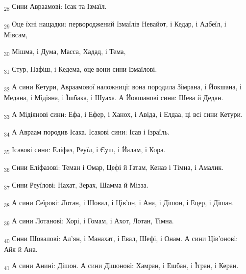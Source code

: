 \begin{tcolorbox}
\textsubscript{28} Сини Авраамові: Ісак та Ізмаїл.
\end{tcolorbox}
\begin{tcolorbox}
\textsubscript{29} Оце їхні нащадки: первороджений Ізмаїлів Невайот, і Кедар, і Адбеїл, і Мівсам,
\end{tcolorbox}
\begin{tcolorbox}
\textsubscript{30} Мішма, і Дума, Масса, Хадад, і Тема,
\end{tcolorbox}
\begin{tcolorbox}
\textsubscript{31} Єтур, Нафіш, і Кедема, оце вони сини Ізмаїлові.
\end{tcolorbox}
\begin{tcolorbox}
\textsubscript{32} А сини Кетури, Авраамової наложниці: вона породила Зімрана, і Йокшана, і Медана, і Мідіяна, і Їшбака, і Шуаха. А Йокшанові сини: Шева й Дедан.
\end{tcolorbox}
\begin{tcolorbox}
\textsubscript{33} А Мідіянові сини: Ефа, і Ефер, і Ханох, і Авіда, і Елдаа, ці всі сини Кетури.
\end{tcolorbox}
\begin{tcolorbox}
\textsubscript{34} А Авраам породив Ісака. Ісакові сини: Ісав і Ізраїль.
\end{tcolorbox}
\begin{tcolorbox}
\textsubscript{35} Ісавові сини: Еліфаз, Реуїл, і Єуш, і Йалам, і Кора.
\end{tcolorbox}
\begin{tcolorbox}
\textsubscript{36} Сини Еліфазові: Теман і Омар, Цефі й Ґатам, Кеназ і Тімна, і Амалик.
\end{tcolorbox}
\begin{tcolorbox}
\textsubscript{37} Сини Реуїлові: Нахат, Зерах, Шамма й Мізза.
\end{tcolorbox}
\begin{tcolorbox}
\textsubscript{38} А сини Сеїрові: Лотан, і Шовал, і Ців'он, і Ана, і Дішон, і Ецер, і Дішан.
\end{tcolorbox}
\begin{tcolorbox}
\textsubscript{39} А сини Лотанові: Хорі, і Гомам, і Ахот, Лотан, Тімна.
\end{tcolorbox}
\begin{tcolorbox}
\textsubscript{40} Сини Шовалові: Ал'ян, і Манахат, і Евал, Шефі, і Онам. А сини Ців'онові: Айя й Ана.
\end{tcolorbox}
\begin{tcolorbox}
\textsubscript{41} А сини Анині: Дішон. А сини Дішонові: Хамран, і Ешбан, і Їтран, і Керан.
\end{tcolorbox}
